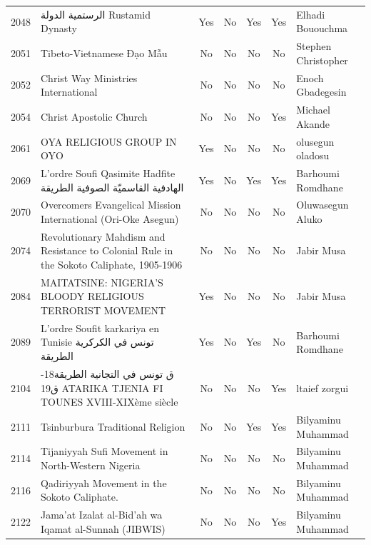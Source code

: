 {\begin{longtable}{rp{3.5cm}ccccp{3cm}}
2048 & {\raggedright {\arabicfont الرستمية الدولة} Rustamid Dynasty} & Yes & No & Yes & Yes & {\raggedright Elhadi Bououchma} \\
2051 & {\raggedright Tibeto-Vietnamese Đạo Mẫu} & No & No & No & No & {\raggedright Stephen Christopher} \\
2052 & {\raggedright Christ Way Ministries International} & No & No & No & No & {\raggedright Enoch Gbadegesin} \\
2054 & {\raggedright Christ Apostolic Church} & No & No & No & Yes & {\raggedright Michael Akande} \\
2061 & {\raggedright OYA RELIGIOUS GROUP IN OYO} & Yes & No & No & No & {\raggedright olusegun oladosu} \\
2069 & {\raggedright L'ordre Soufi Qasimite Hadfite {\arabicfont الهادفية القاسميّة الصوفية الطريقة}} & Yes & No & Yes & Yes & {\raggedright Barhoumi Romdhane} \\
2070 & {\raggedright Overcomers Evangelical Mission International (Ori-Oke Asegun)} & No & No & No & No & {\raggedright Oluwasegun Aluko} \\
2074 & {\raggedright Revolutionary Mahdism and Resistance to Colonial Rule in the Sokoto Caliphate, 1905-1906} & No & No & No & No & {\raggedright Jabir  Musa} \\
2084 & {\raggedright MAITATSINE: NIGERIA'S BLOODY RELIGIOUS TERRORIST MOVEMENT} & Yes & No & No & No & {\raggedright Jabir  Musa} \\
2089 & {\raggedright L'ordre Soufit karkariya en Tunisie {\arabicfont تونس في الكركرية الطريقة}} & Yes & No & Yes & No & {\raggedright Barhoumi Romdhane} \\
2104 & {\raggedright {\arabicfont ق تونس في التجانية الطريقة}18-{\arabicfont ق}19 ATARIKA TJENIA FI TOUNES  XVIII-XIXème siècle} & No & No & No & Yes & {\raggedright ltaief zorgui} \\
2111 & {\raggedright Tsinburbura Traditional Religion} & No & No & Yes & Yes & {\raggedright Bilyaminu Muhammad} \\
2114 & {\raggedright Tijaniyyah Sufi Movement in North-Western Nigeria} & No & No & No & No & {\raggedright Bilyaminu Muhammad} \\
2116 & {\raggedright Qadiriyyah Movement in the Sokoto Caliphate.} & No & No & No & No & {\raggedright Bilyaminu Muhammad} \\
2122 & {\raggedright Jama'at Izalat al-Bid'ah wa Iqamat al-Sunnah (JIBWIS)} & No & No & No & Yes & {\raggedright Bilyaminu Muhammad} \\

\end{longtable}}
